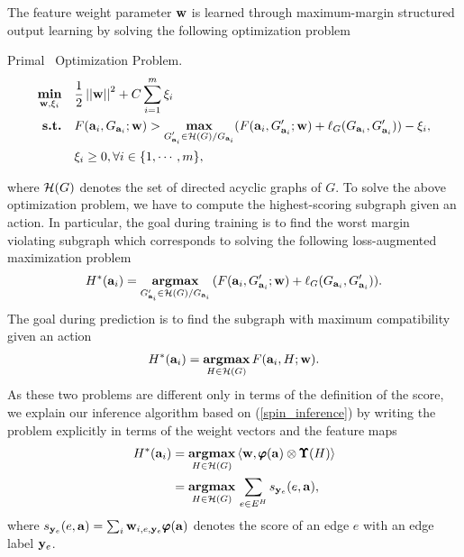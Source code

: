 {%
The feature weight parameter $\mathbf {w}$ is learned through maximum-margin structured output learning by solving the following optimization problem
\begin{definition}{Primal \spin\ Optimization Problem.}
\begin{align*}
	\underset{\mathbf {w},\mathbf{\xi}_i}{\textbf{min}} &\quad \frac{1}{2}\left|\left| \mathbf {w} \right|\right|^2+C\sum_{i=1}^{m}\xi_i\\
	\textbf{s.t.} &\quad F(\mathbf {a}_i,G_{\mathbf {a}_i};\mathbf {w}) > \underset{\substack{G_{\mathbf {a}_i}'\in\mathcal{H}(G)/G_{\mathbf {a}_i}}}{\textbf{max}}(F(\mathbf {a}_i,G_{\mathbf {a}_i}';\mathbf {w})+\mathbf {\ell}_{G}(G_{\mathbf {a}_i},G_{\mathbf {a}_i}')) - \xi_i,\\
	&\quad \xi_i\ge0, \forall i\in\{1,\cdots,m\},
\end{align*}
\end{definition}
\noindent
where $\mathcal{H}(G)$ denotes the set of directed acyclic graphs of $G$.
To solve the above optimization problem, we have to compute the highest-scoring subgraph given an action. 
In particular, the goal during training is to find the worst margin violating subgraph which corresponds to solving the following loss-augmented maximization problem
\begin{align*}
	H^*(\mathbf {a}_i) = \underset{G_{\mathbf {a}_i}'\in\mathcal{H}(G)/G_{\mathbf {a}_i}}{\textbf{argmax}}\, (F(\mathbf {a}_i,G_{\mathbf {a}_i}';\mathbf {w})+\mathbf {\ell}_{G}(G_{\mathbf {a}_i},G_{\mathbf {a}_i}')).
\end{align*}
The goal during prediction is to find the subgraph with maximum compatibility given an action
\begin{align}
	H^*(\mathbf {a}_i) = \underset{H\in\mathcal{H}(G)}{\textbf{argmax}}\, F(\mathbf {a}_i,H;\mathbf {w}) \label{spin_inference}.
\end{align}
As these two problems are different only in terms of the definition of the score, we explain our inference algorithm based on (\ref{spin_inference}) by writing the problem explicitly in terms of the weight vectors and the feature maps
\begin{align}
	H^*(\mathbf {a}_i) &= \underset{H\in\mathcal{H}(G)}{\textbf{argmax}}\, \langle \mathbf {w}, \pmb \varphi(\mathbf {a})\otimes\pmb \Upsilon(H) \rangle \nonumber \\
	&= \underset{H\in\mathcal{H}(G)}{\textbf{argmax}}\, \sum_{e\in E^H}s_{\mathbf {y}_e}(e,\mathbf {a}), \label{spin_np}
\end{align}
where $s_{\mathbf {y}_e}(e,\mathbf {a}) = \sum_{i}\mathbf {w}_{i,e,\mathbf {y}_e}\pmb \varphi(\mathbf {a})$ denotes the score of an edge $e$ with an edge label $\mathbf {y}_e$.

}
